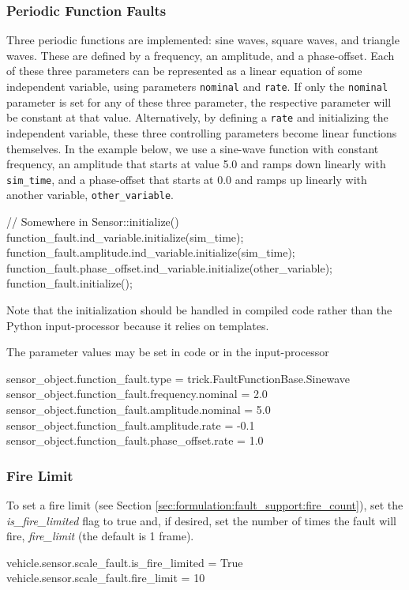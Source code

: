 \documentclass[11pt,fleqn]{report}
\begin{document}
\subsubsection{Periodic Function Faults}
Three periodic functions are implemented: sine waves, square waves, and
triangle waves.
These are defined by a frequency, an amplitude, and a phase-offset.
Each of these three parameters can be represented as a linear equation of some
independent variable, using parameters \verb"nominal" and \verb'rate'.  If only
the \verb"nominal" parameter is set for any of these three parameter, the
respective parameter will be constant at that value.
Alternatively, by defining a \verb"rate" and initializing the independent
variable, these three controlling parameters become linear functions themselves.
In the example below, we use a sine-wave function with constant frequency, an
amplitude that starts at value 5.0 and ramps down linearly with \verb"sim_time",
and a phase-offset that starts at 0.0 and ramps up linearly with another
variable, \verb"other_variable".
\begin{codeC}
// Somewhere in Sensor::initialize()
function_fault.ind_variable.initialize(sim_time);
function_fault.amplitude.ind_variable.initialize(sim_time);
function_fault.phase_offset.ind_variable.initialize(other_variable);
function_fault.initialize();
\end{codeC}
Note that the initialization should be handled in compiled code rather than the
Python input-processor because it relies on templates.

The parameter values may be set in code or in the input-processor
\begin{codePython}
sensor_object.function_fault.type = trick.FaultFunctionBase.Sinewave
sensor_object.function_fault.frequency.nominal = 2.0
sensor_object.function_fault.amplitude.nominal = 5.0
sensor_object.function_fault.amplitude.rate = -0.1
sensor_object.function_fault.phase_offset.rate = 1.0
\end{codePython}

\subsubsection{Fire Limit}
To set a fire limit (see Section
\ref{sec:formulation:fault_support:fire_count}), set the
\textit{is\_fire\_limited}
flag to true and, if desired, set the number of times the fault will fire,
\textit{fire\_limit} (the default is 1 frame).
\begin{codePython}
 vehicle.sensor.scale_fault.is_fire_limited = True
 vehicle.sensor.scale_fault.fire_limit = 10
\end{codePython}
\end{document}
